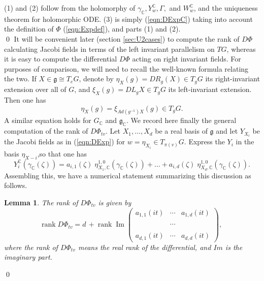 \documentclass[12pt,reqno]{amsart}\usepackage{amssymb,amsmath,amscd,epsfig,amsthm,enumerate,import,eufrak}
\newtheorem{lemma}[theorem]{Lemma}
\theoremstyle{definition}
\theoremstyle{remark}
\numberwithin{equation}{section}
\theoremstyle{plain}
\theoremstyle{definition}
\def \c {\mathbb{C}}
\def \mfg {\mathfrak{g}}
\def \vs {\vskip 2mm}
\theoremstyle{remark}
\numberwithin{theorem}{section}
\begin{document}
%
\vs\vs
%
%
(1) and (2) follow from the holomorphy of $\gamma_{\c}, Y^{\c}_w, \Gamma,$ and $W^{\c}_w$, and the uniqueness theorem for holomorphic ODE.  (3) is simply (\ref{eqn:DExpC}) taking into account the definition of $\Phi$ (\ref{eqn:Expdef}), and parts (1) and (2). \\
%
\qed
%
\vs\vs
%
%
%
%
It will be convenient later (section \ref{sec:U2cases}) to compute the rank of $D\Phi$ calculating Jacobi fields in terms of the left invariant parallelism on $TG$, whereas it is easy to compute the differential $D\Phi$ acting on right invariant fields. For purposes of comparison, we will need to recall the well-known formula relating the two. If $X \in \mfg \cong T_eG$, denote by $\eta_X(g) =DR_{g}(X) \in T_gG$ its right-invariant extension over all of $G$, and $\xi_X(g) = DL_{g} X \in T_gG$ its left-invariant extension. Then one has
%
\vs
%
%
%
	\begin{equation}\label{eqn:xi2eta}
		\eta_X(g) = \xi_{Ad(g^{-1})X}(g) \in T_gG.
	\end{equation}
%
%
\vs\vs
%
%	 
A similar equation holds for $G_{\c}$ and $\mfg_{\c}$. We record here finally the general computation of the rank of $D\Phi_{t v}$. Let $X_1,\ldots, X_d$ be a real basis of $\mfg$ and let $Y_{X_i}$ be the Jacobi fields as in (\ref{eqn:DExp}) for $w = \eta_{X_i} \in T_{\pi(v)}G.$ Express the $Y_i$ in the basis $\eta_{X-i}$,so that one has
%
%
\vs
%
%
\begin{equation}\label{eqn:eta2Y}
	Y^{\c}_i(\gamma_{\c}(\zeta)) = a_{i, 1}(\zeta) \; \eta^{1,0}_{X_1,\c}(\gamma_{\c}(\zeta)) + \ldots + a_{i, d}(\zeta) \; \eta^{1,0}_{X_d, \c}(\gamma_{\c}(\zeta)).
\end{equation}
%
%
\vs\vs
%
Assembling this, we have a numerical statement summarizing this discussion as follows.
%
%
%
\vs
%
%
%
%
\begin{lemma}\label{lem:rankDPhi} The rank of $D\Phi_{t v}$ is given by
	\begin{equation}\label{eqn:rank}
		\text{rank}\; D\Phi_{t v} = d\, + \;{\text{rank}}\; {\; \text{Im} \;} \left(\begin{array}{ccc} a_{1,1}(i t) & \cdots & a_{1,d}(i t) \\ && \\ & \cdots & \\ && \\ a_{d, 1}(i t) & \cdots & a_{d,d}(i t) \end{array} \right),
	\end{equation}
where the rank of $D\Phi_{t v}$ means the real rank of the differential, and $Im$ is the imaginary part.
\end{lemma}
\qed
%
%
%
%
\vs\vs\vs
%
%
%
%
%
%
%
%
\end{document}
